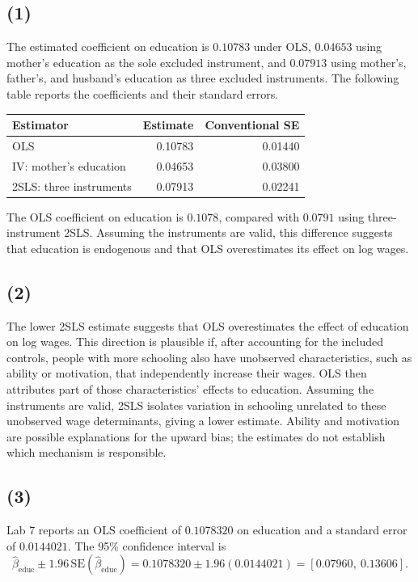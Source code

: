 \documentclass[11pt]{article}
\begin{document}
\subsection{(1)}
The estimated coefficient on education is $0.10783$ under OLS, $0.04653$
using mother's education as the sole excluded instrument, and $0.07913$
using mother's, father's, and husband's education as three excluded instruments.
The following table reports the coefficients and their standard errors.
\begin{center}
\begin{tabular}{lrr}
\toprule
Estimator & Estimate & Conventional SE\\
\midrule
OLS & 0.10783 & 0.01440\\
IV: mother's education & 0.04653 & 0.03800\\
2SLS: three instruments & 0.07913 & 0.02241\\
\bottomrule
\end{tabular}
\end{center}
The OLS coefficient on education is $0.1078$, compared with $0.0791$
using three-instrument 2SLS. Assuming the instruments are valid, this
difference suggests that education is endogenous and that OLS overestimates
its effect on log wages.

\subsection{(2)}
The lower 2SLS estimate suggests that OLS overestimates the effect of
education on log wages. This direction is plausible if, after accounting
for the included controls, people with more schooling also have unobserved
characteristics, such as ability or motivation, that independently increase
their wages. OLS then attributes part of those characteristics' effects to
education. Assuming the instruments are valid, 2SLS isolates variation in
schooling unrelated to these unobserved wage determinants, giving a lower
estimate. Ability and motivation are possible explanations for the upward
bias; the estimates do not establish which mechanism is responsible.

\subsection{(3)}
Lab 7 reports an OLS coefficient of $0.1078320$ on education and a
standard error of $0.0144021$. The 95\% confidence interval is
\[
    \hat\beta_{\mathrm{educ}}\pm1.96\,\mathrm{SE}(\hat\beta_{\mathrm{educ}})
    =0.1078320\pm1.96(0.0144021)
    =\boxed{[0.07960,\ 0.13606]}.
\]
\end{document}
